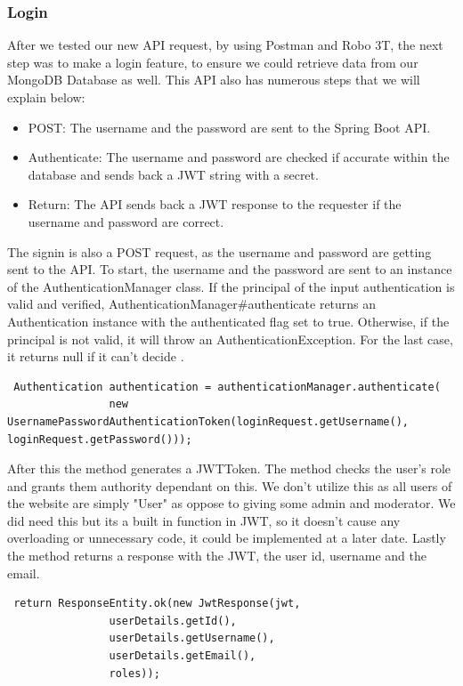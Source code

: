 \subsubsection{Login}
After we tested our new API request, by using Postman and Robo 3T, the next step was to make a login feature, to ensure we could retrieve data from our MongoDB Database as well. This API also has numerous steps that we will explain below: \par
\begin{itemize}
    \item POST: The username and the password are sent to the Spring Boot API.
    \item Authenticate: The username and password are checked if accurate within the database and sends back a JWT string with a secret.
    \item Return: The API sends back a JWT response to the requester if the username and password are correct.
\end{itemize}
The signin is also a POST request, as the username and password are getting sent to the API. To start, the username and the password are sent to an instance of the AuthenticationManager class. If the principal of the input authentication is valid and verified, AuthenticationManager#authenticate returns an Authentication instance with the authenticated flag set to true. Otherwise, if the principal is not valid, it will throw an AuthenticationException. For the last case, it returns null if it can't decide \cite{Baeldung}. \par
\begin{verbatim}
 Authentication authentication = authenticationManager.authenticate(
                new UsernamePasswordAuthenticationToken(loginRequest.getUsername(), loginRequest.getPassword())); 
\end{verbatim}
\par After this the method generates a JWTToken. The method checks the user's role and grants them authority dependant on this. We don't utilize this as all users of the website are simply "User" as oppose to giving some admin and moderator. We did need this but its a built in function in JWT, so it doesn't cause any overloading or unnecessary code, it could be implemented at a later date. Lastly the method returns a response with the JWT, the user id, username and the email.\par
\begin{verbatim}
 return ResponseEntity.ok(new JwtResponse(jwt,
                userDetails.getId(),
                userDetails.getUsername(),
                userDetails.getEmail(),
                roles));
\end{verbatim}

